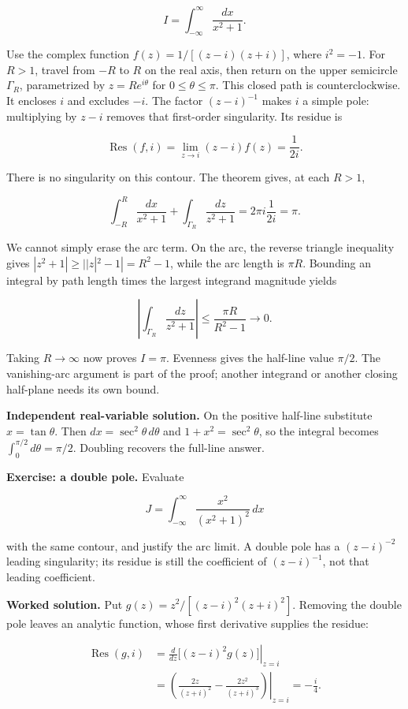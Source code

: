 \[
I=\int_{-\infty}^{\infty}\frac{dx}{x^2+1}.
\]

Use the complex function \(f(z)=1/[(z-i)(z+i)]\), where \(i^2=-1\). For \(R>1\), travel from \(-R\) to \(R\) on the real axis, then return on the upper semicircle \(\Gamma_R\), parametrized by \(z=Re^{i\theta}\) for \(0\leq\theta\leq\pi\). This closed path is counterclockwise. It encloses \(i\) and excludes \(-i\). The factor \((z-i)^{-1}\) makes \(i\) a simple pole: multiplying by \(z-i\) removes that first-order singularity. Its residue is

\[
\operatorname{Res}(f,i)
=\lim_{z\to i}(z-i)f(z)
=\frac{1}{2i}.
\]

There is no singularity on this contour. The theorem gives, at each \(R>1\),

\[
\int_{-R}^{R}\frac{dx}{x^2+1}
+\int_{\Gamma_R}\frac{dz}{z^2+1}
=2\pi i\frac{1}{2i}=\pi.
\]

We cannot simply erase the arc term. On the arc, the reverse triangle inequality gives \(|z^2+1|\geq ||z|^2-1|=R^2-1\), while the arc length is \(\pi R\). Bounding an integral by path length times the largest integrand magnitude yields

\[
\left|\int_{\Gamma_R}\frac{dz}{z^2+1}\right|
\leq\frac{\pi R}{R^2-1}\longrightarrow0.
\]

Taking \(R\to\infty\) now proves \(I=\pi\). Evenness gives the half-line value \(\pi/2\). The vanishing-arc argument is part of the proof; another integrand or another closing half-plane needs its own bound.

\textbf{Independent real-variable solution.} On the positive half-line substitute \(x=\tan\theta\). Then \(dx=\sec^2\theta\,d\theta\) and \(1+x^2=\sec^2\theta\), so the integral becomes \(\int_0^{\pi/2}d\theta=\pi/2\). Doubling recovers the full-line answer.

\textbf{Exercise: a double pole.} Evaluate

\[
J=\int_{-\infty}^{\infty}\frac{x^2}{(x^2+1)^2}\,dx
\]

with the same contour, and justify the arc limit. A double pole has a \((z-i)^{-2}\) leading singularity; its residue is still the coefficient of \((z-i)^{-1}\), not that leading coefficient.

\textbf{Worked solution.} Put \(g(z)=z^2/[(z-i)^2(z+i)^2]\). Removing the double pole leaves an analytic function, whose first derivative supplies the residue:

\[
\begin{aligned}
\operatorname{Res}(g,i)
&=\left.\frac{d}{dz}\big[(z-i)^2g(z)\big]\right|_{z=i}\\
&=\left.\left(\frac{2z}{(z+i)^2}-\frac{2z^2}{(z+i)^3}\right)\right|_{z=i}
=-\frac{i}{4}.
\end{aligned}
\]

